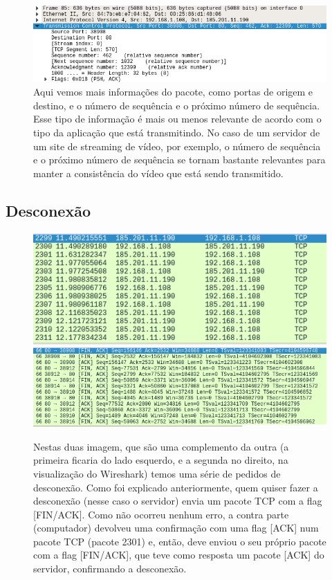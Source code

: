 \documentclass{article}
\begin{document}
\begin{figure}[H]
    \centering
    \includegraphics[width=\textwidth]{images/data2.png}
    \caption{Aqui vemos mais informações do pacote, como portas de origem e destino, e o número de sequência e o próximo número de sequência. Esse tipo de informação é mais ou menos relevante de acordo com o tipo da aplicação que está transmitindo. No caso de um servidor de um site de streaming de vídeo, por exemplo, o número de sequência e o próximo número de sequência se tornam bastante relevantes para manter a consistência do vídeo que está sendo transmitido.}
    \label{fig:data2}
\end{figure}{}


\subsection{Desconexão}

\begin{figure}[H]
    \centering
    \includegraphics[width=\textwidth]{images/disconectA.png}
    \includegraphics[width=\textwidth]{images/disconectB.png}
    \caption{Nestas duas imagem, que são uma complemento da outra (a primeira ficaria do lado esquerdo, e a segunda no direito, na visualização do Wireshark) temos uma série de pedidos de desconexão. Como foi explicado anteriormente, quem quiser fazer a desconexão (nesse caso o servidor) envia um pacote TCP com a flag [FIN/ACK]. Como não ocorreu nenhum erro, a contra parte (computador) devolveu uma confirmação com uma flag [ACK] num pacote TCP (pacote 2301) e, então, deve enviou o seu próprio pacote com a flag [FIN/ACK], que teve como resposta um pacote [ACK] do servidor, confirmando a desconexão.}
    \label{fig:data2}
\end{figure}{}
\end{document}
